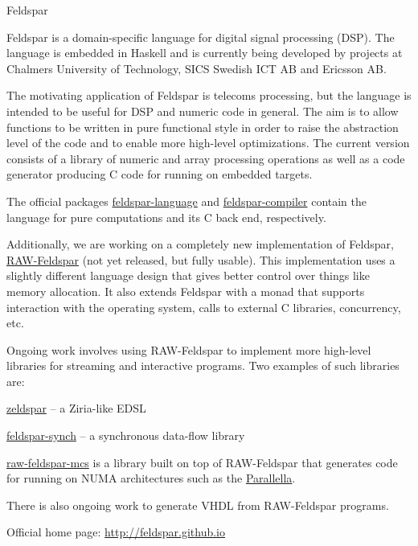 \begin{hcarentry}[updated]{Feldspar}
\label{feldspar}
\makeheader

Feldspar is a domain-specific language for digital signal processing (DSP). The
language is embedded in Haskell and is currently being developed by projects at
Chalmers University of Technology, SICS Swedish ICT AB and
Ericsson AB.

The motivating application of Feldspar is telecoms processing, but the language
is intended to be useful for DSP and numeric code in general. The aim is to
allow functions to be written in pure functional style in order to raise the
abstraction level of the code and to enable more high-level optimizations. The
current version consists of a library of numeric and array processing operations
as well as a code generator producing C code for running on embedded targets.

The official packages
  \mbox{\href{http://hackage.haskell.org/package/feldspar-language}{feldspar-language}}
and
  \mbox{\href{http://hackage.haskell.org/package/feldspar-compiler}{feldspar-compiler}}
contain the language for pure computations and its C back end, respectively.

Additionally, we are working on a completely new implementation of Feldspar,
\href{https://github.com/emilaxelsson/raw-feldspar}{RAW-Feldspar} (not yet
released, but fully usable). This implementation uses a slightly different
language design that gives better control over things like memory allocation. It
also extends Feldspar with a monad that supports interaction with the operating
system, calls to external C libraries, concurrency, etc.

Ongoing work involves using RAW-Feldspar to implement more high-level libraries
for streaming and interactive programs. Two examples of such libraries are:

\begin{compactitem}
\item \href{https://github.com/koengit/zeldspar}{zeldspar} -- a Ziria-like EDSL
\item \href{https://github.com/emilaxelsson/feldspar-synch}{feldspar-synch} -- a synchronous data-flow library
\end{compactitem}

\href{https://github.com/kmate/raw-feldspar-mcs}{raw-feldspar-mcs} is a
library built on top of RAW-Feldspar that generates code for running on NUMA
architectures such as the \href{http://www.parallella.org}{Parallella}.

There is also ongoing work to generate VHDL from RAW-Feldspar programs.

\FurtherReading
\begin{compactitem}
\item Official home page: \url{http://feldspar.github.io}
\end{compactitem}
\end{hcarentry}
